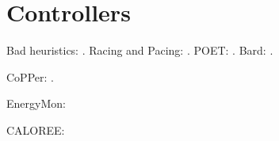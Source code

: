 \chapter{Controllers}

Bad heuristics: \cite{Imes2014}.
Racing and Pacing: \cite{kim-cpsna2015}.
POET: \cite{POET, POETMCSoC}.
Bard: \cite{Bard}.

CoPPer: \cite{CopperTR}.

EnergyMon: \cite{energymon}

CALOREE: \cite{CALOREE}
